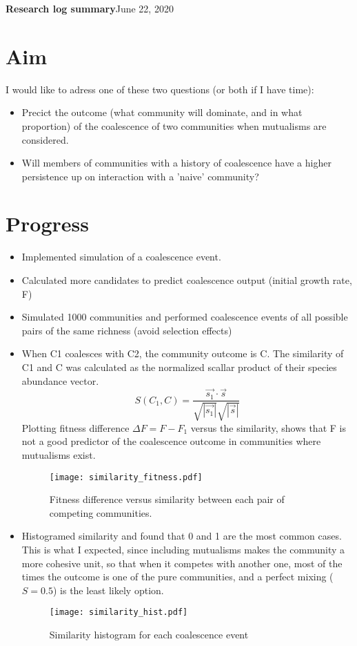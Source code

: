 \documentclass[10pt,letterpaper]{article}
\begin{document}
	
    \LARGE{\textbf{Research log summary}}\hfill\Large{June 22, 2020}
    \section*{Aim}
    	I would like to adress one of these two questions (or both if I have time):\\
    	\begin{itemize}
    		\item Precict the outcome (what community will dominate, and in what proportion) of the coalescence of two communities when mutualisms are considered.
    		\item Will members of communities with a history of coalescence have a higher persistence up on interaction with a 'naive' community?\\
    	\end{itemize}
    	
    \section*{Progress}
		\begin{itemize}
			\item Implemented simulation of a coalescence event.
			\item Calculated more candidates to predict coalescence output (initial growth rate, F)
			\item Simulated 1000 communities and performed coalescence events of all possible pairs of the same richness (avoid selection effects)
			\item When C1 coalesces with C2, the community outcome is C. The similarity of C1 and C was calculated as the normalized scallar product of their species abundance vector.
			\begin{equation}
				S(C_1, C) = \frac{\vec{s_1} \cdot \vec{s}}{\sqrt{|\vec{s_1}|}\sqrt{|\vec{s}|}}
			\end{equation}
			Plotting fitness difference $ \Delta F = F  -  F_1 $ versus the similarity, shows that F is not a good predictor of the coalescence outcome in communities where mutualisms exist.
			\begin{figure}[h]
				\centering
				\texttt{[image: similarity\_fitness.pdf]}
				\caption{Fitness difference versus similarity between each pair of competing communities.}
				\label{fitness_similarity}
			\end{figure}
			\item Histogramed similarity and found that 0 and 1 are the most common cases. This is what I expected, since including mutualisms makes the community a more cohesive unit, so that when it competes with another one, most of the times the outcome is one of the pure communities, and a perfect mixing ($ S = 0.5 $) is the least likely option.
			\begin{figure}[h]
				\centering
				\texttt{[image: similarity\_hist.pdf]}
				\caption{Similarity histogram for each coalescence event}
			\end{figure}
			
    		\end{itemize}
\end{document}
